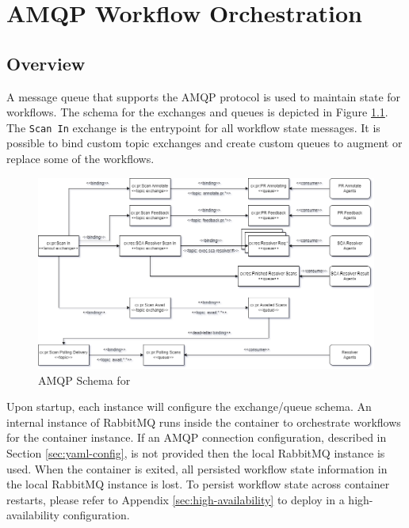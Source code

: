 \chapter{AMQP Workflow Orchestration}\label{sec:amqp-workflow-orch}



\section{Overview}

A message queue that supports the AMQP protocol is used to maintain state for \cxoneflow
workflows.  The schema for the exchanges and queues is depicted in Figure \ref{fig:amqp-schema}.
The \texttt{Scan In} exchange is the entrypoint for all workflow state messages.  It is possible
to bind custom topic exchanges and create custom queues to augment or replace some of the
workflows.


\begin{figure}[h]
    \includegraphics[width=\textwidth]{graphics/cxoneflow-diagrams-Queue.png}
    \caption{AMQP Schema for \cxoneflow}
    \label{fig:amqp-schema}
\end{figure}


Upon startup, each \cxoneflow instance will configure the exchange/queue schema.  An
internal instance of RabbitMQ runs inside the \cxoneflow container to orchestrate
workflows for the container instance.  If an AMQP connection configuration, described in
Section \ref{sec:yaml-config}, is not provided then the local RabbitMQ instance is
used.  When the container is exited, all persisted workflow state information in the local
RabbitMQ instance is lost.  To persist workflow state across container restarts, please
refer to Appendix \ref{sec:high-availability} to deploy \cxoneflow in a
high-availability configuration.

